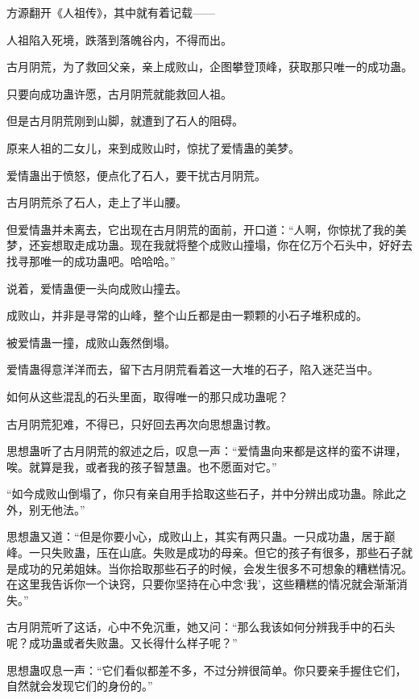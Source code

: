 
\begin{this_body}



方源翻开《人祖传》，其中就有着记载——

人祖陷入死境，跌落到落魄谷内，不得而出。

古月阴荒，为了救回父亲，亲上成败山，企图攀登顶峰，获取那只唯一的成功蛊。

只要向成功蛊许愿，古月阴荒就能救回人祖。

但是古月阴荒刚到山脚，就遭到了石人的阻碍。

原来人祖的二女儿，来到成败山时，惊扰了爱情蛊的美梦。

爱情蛊出于愤怒，便点化了石人，要干扰古月阴荒。

古月阴荒杀了石人，走上了半山腰。

但爱情蛊并未离去，它出现在古月阴荒的面前，开口道：“人啊，你惊扰了我的美梦，还妄想取走成功蛊。现在我就将整个成败山撞塌，你在亿万个石头中，好好去找寻那唯一的成功蛊吧。哈哈哈。”

说着，爱情蛊便一头向成败山撞去。

成败山，并非是寻常的山峰，整个山丘都是由一颗颗的小石子堆积成的。

被爱情蛊一撞，成败山轰然倒塌。

爱情蛊得意洋洋而去，留下古月阴荒看着这一大堆的石子，陷入迷茫当中。

如何从这些混乱的石头里面，取得唯一的那只成功蛊呢？

古月阴荒犯难，不得已，只好回去再次向思想蛊讨教。

思想蛊听了古月阴荒的叙述之后，叹息一声：“爱情蛊向来都是这样的蛮不讲理，唉。就算是我，或者我的孩子智慧蛊。也不愿面对它。”

“如今成败山倒塌了，你只有亲自用手拾取这些石子，并中分辨出成功蛊。除此之外，别无他法。”

思想蛊又道：“但是你要小心，成败山上，其实有两只蛊。一只成功蛊，居于巅峰。一只失败蛊，压在山底。失败是成功的母亲。但它的孩子有很多，那些石子就是成功的兄弟姐妹。当你拾取那些石子的时候，会发生很多不可想象的糟糕情况。在这里我告诉你一个诀窍，只要你坚持在心中念‘我’，这些糟糕的情况就会渐渐消失。”

古月阴荒听了这话，心中不免沉重，她又问：“那么我该如何分辨我手中的石头呢？成功蛊或者失败蛊。又长得什么样子呢？”

思想蛊叹息一声：“它们看似都差不多，不过分辨很简单。你只要亲手握住它们，自然就会发现它们的身份的。”


\end{this_body}
